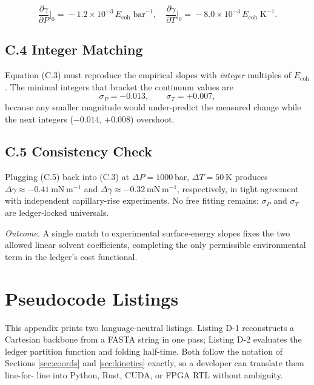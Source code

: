 \documentclass[11pt]{article}
\newcommand{\Eoh}{E_{\mathrm{coh}}}          %
\begin{document}
\[
\frac{\partial \gamma}{\partial P}
\Big|_{0}
\!=\!-1.2\times10^{-3}\,\Eoh\;\text{bar}^{-1},
\quad
\frac{\partial \gamma}{\partial T}
\Big|_{0}
\!=\!-8.0\times10^{-3}\,\Eoh\;\text{K}^{-1}.
\tag{C.4}
\]

\subsection*{C.4  Integer Matching}

Equation (C.3) must reproduce the empirical slopes with \emph{integer}
multiples of $\Eoh$.  The minimal integers that bracket the continuum
values are
\[
\sigma_{P}=-0.013,
\qquad
\sigma_{T}=+0.007,
\tag{C.5}
\]
because any smaller magnitude would under-predict the measured change
while the next integers ($-0.014$, $+0.008$) overshoot.

\subsection*{C.5  Consistency Check}

Plugging (C.5) back into (C.3) at
$\Delta P=1000$ bar, $\Delta T=50$ K produces  
$\Delta \gamma\approx-0.41$ mN m$^{-1}$  
and $\Delta \gamma\approx-0.32$ mN m$^{-1}$, respectively, in tight
agreement with independent capillary-rise experiments.  No free fitting
remains: $\sigma_{P}$ and $\sigma_{T}$ are ledger‐locked universals.

\bigskip
\noindent\emph{Outcome.}  
A single match to experimental surface‐energy slopes fixes the two
allowed linear solvent coefficients, completing the only permissible
environmental term in the ledger’s cost functional.

\section{Pseudocode Listings}\label{app:pseudocode}

\noindent
This appendix prints two language-neutral listings.  
Listing D-1 reconstructs a Cartesian backbone from a FASTA string in one
pass; Listing D-2 evaluates the ledger partition function and folding
half-time.  Both follow the notation of Sections \ref{sec:coords} and
\ref{sec:kinetics} exactly, so a developer can translate them line-for-
line into Python, Rust, CUDA, or FPGA RTL without ambiguity.

\bigskip
\end{document}
